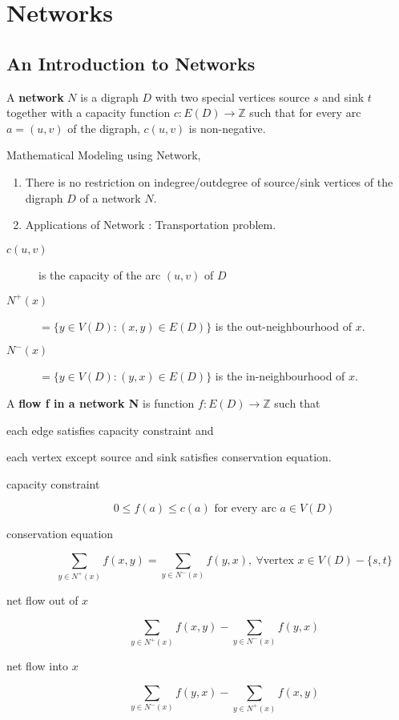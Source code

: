 \section{Networks}
\subsection{An Introduction to Networks}
\begin{definition}
	A \textbf{network} $N$ is a digraph $D$ with two special vertices source $s$ and sink $t$ together with a capacity function $c : E(D) \to \mathbb{Z}$ such that for every arc $a = (u,v)$ of the digraph, $c(u,v)$ is non-negative.
\end{definition}

\begin{remark} Mathematical Modeling using Network,
	\begin{enumerate}
		\item There is no restriction on indegree/outdegree of source/sink vertices of the digraph $D$ of a network $N$.
		\item Applications of Network : Transportation problem.
	\end{enumerate}
\end{remark}

\begin{description}
	\item[$c(u,v)$] is the capacity of the arc $(u,v)$ of $D$
	\item[$N^+(x)$] $= \{ y \in V(D) : (x,y) \in E(D)\}$ is the out-neighbourhood of $x$.
	\item[$N^-(x)$] $= \{ y \in V(D) : (y,x) \in E(D)\}$ is the in-neighbourhood of $x$.
\end{description}

\begin{definition}
	A \textbf{flow f in a network N} is function $f : E(D) \to \mathbb{Z}$ such that
	\begin{enumerate*}
		\item each edge satisfies capacity constraint and
		\item each vertex except source and sink satisfies conservation equation.
	\end{enumerate*}
\end{definition}

\begin{description}
	\item[capacity constraint] 
		\begin{equation}
		0 \le f(a) \le c(a) \text{ for every arc }a \in V(D)
		\end{equation}
	\item[conservation equation] 
		\begin{equation}
			\sum_{y \in N^+(x)} f(x,y) = \sum_{y \in N^-(x)} f(y,x),\ \forall \text{vertex } x \in V(D)-\{s,t\}
		\label{equ:conservation}
		\end{equation}
	\item[net flow out of $x$] $$\sum_{y \in N^+(x)} f(x,y) - \sum_{y \in N^-(x)} f(y,x)$$
	\item[net flow into $x$] $$\sum_{y \in N^-(x)} f(y,x) - \sum_{y \in N^+(x)} f(x,y)$$
\end{description}


